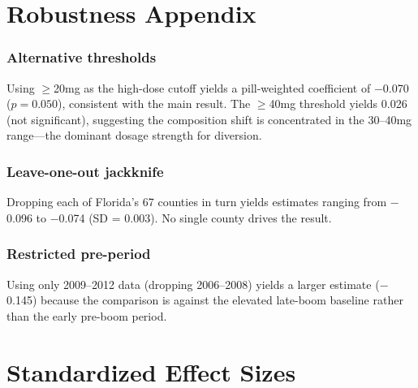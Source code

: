 \documentclass[12pt]{article}
\begin{document}
\section{Robustness Appendix}

\subsubsection*{Alternative thresholds} Using $\geq$20mg as the high-dose cutoff yields a pill-weighted coefficient of $-$0.070 ($p = 0.050$), consistent with the main result. The $\geq$40mg threshold yields 0.026 (not significant), suggesting the composition shift is concentrated in the 30--40mg range---the dominant dosage strength for diversion.

\subsubsection*{Leave-one-out jackknife} Dropping each of Florida's 67 counties in turn yields estimates ranging from $-$0.096 to $-$0.074 (SD = 0.003). No single county drives the result.

\subsubsection*{Restricted pre-period} Using only 2009--2012 data (dropping 2006--2008) yields a larger estimate ($-$0.145) because the comparison is against the elevated late-boom baseline rather than the early pre-boom period.


\section{Standardized Effect Sizes}
\label{sec:sde}

{\small}
\end{document}
